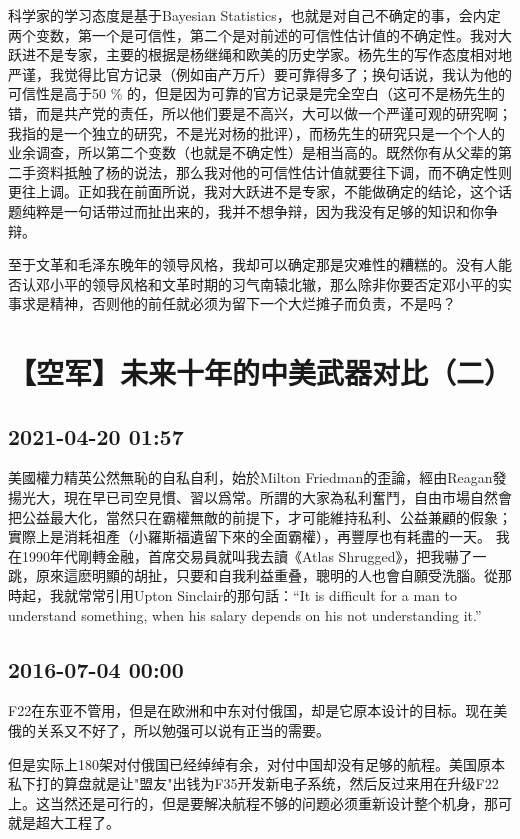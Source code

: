 \documentclass[twocolumn]{ctexart}
\begin{document}
科学家的学习态度是基于Bayesian Statistics，也就是对自己不确定的事，会内定两个变数，第一个是可信性，第二个是对前述的可信性估计值的不确定性。我对大跃进不是专家，主要的根据是杨继绳和欧美的历史学家。杨先生的写作态度相对地严谨，我觉得比官方记录（例如亩产万斤）要可靠得多了；换句话说，我认为他的可信性是高于50 \% 的，但是因为可靠的官方记录是完全空白（这可不是杨先生的错，而是共产党的责任，所以他们要是不高兴，大可以做一个严谨可观的研究啊；我指的是一个独立的研究，不是光对杨的批评），而杨先生的研究只是一个个人的业余调查，所以第二个变数（也就是不确定性）是相当高的。既然你有从父辈的第二手资料抵触了杨的说法，那么我对他的可信性估计值就要往下调，而不确定性则更往上调。正如我在前面所说，我对大跃进不是专家，不能做确定的结论，这个话题纯粹是一句话带过而扯出来的，我并不想争辩，因为我没有足够的知识和你争辩。

至于文革和毛泽东晚年的领导风格，我却可以确定那是灾难性的糟糕的。没有人能否认邓小平的领导风格和文革时期的习气南辕北辙，那么除非你要否定邓小平的实事求是精神，否则他的前任就必须为留下一个大烂摊子而负责，不是吗？\section*{【空军】未来十年的中美武器对比（二）}
\subsection*{2021-04-20 01:57}

美國權力精英公然無恥的自私自利，始於Milton Friedman的歪論，經由Reagan發揚光大，現在早已司空見慣、習以爲常。所謂的大家為私利奮鬥，自由市場自然會把公益最大化，當然只在霸權無敵的前提下，才可能維持私利、公益兼顧的假象；實際上是消耗祖產（小羅斯福遺留下來的全面霸權），再豐厚也有耗盡的一天。
我在1990年代剛轉金融，首席交易員就叫我去讀《Atlas Shrugged》，把我嚇了一跳，原來這麽明顯的胡扯，只要和自我利益重叠，聰明的人也會自願受洗腦。從那時起，我就常常引用Upton Sinclair的那句話：“It is difficult for a man to understand something, when his salary depends on his not understanding it.”
\subsection*{2016-07-04 00:00}
F22在东亚不管用，但是在欧洲和中东对付俄国，却是它原本设计的目标。现在美俄的关系又不好了，所以勉强可以说有正当的需要。

但是实际上180架对付俄国已经绰绰有余，对付中国却没有足够的航程。美国原本私下打的算盘就是让"盟友"出钱为F35开发新电子系统，然后反过来用在升级F22上。这当然还是可行的，但是要解决航程不够的问题必须重新设计整个机身，那可就是超大工程了。
\end{document}

